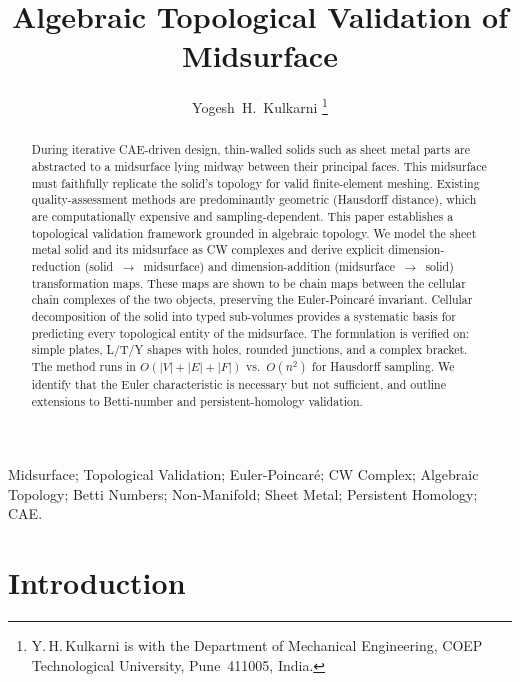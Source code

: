 \documentclass[journal,twocolumn,10pt]{IEEEtran}
\begin{document}

\title{Algebraic Topological Validation of Midsurface}

\author{Yogesh~H.~Kulkarni%
  \thanks{Y.\,H.\,Kulkarni is with the Department of Mechanical Engineering,
          COEP Technological University, Pune~411005, India.}}

\maketitle

\begin{abstract}
During iterative CAE-driven design, thin-walled solids such as sheet metal
parts are abstracted to a midsurface lying midway between their principal
faces. This midsurface must faithfully replicate the solid's topology for
valid finite-element meshing. Existing quality-assessment methods are
predominantly geometric (Hausdorff distance), which are computationally
expensive and sampling-dependent.
This paper establishes a topological validation framework grounded in
algebraic topology. We model the sheet metal solid and its midsurface as
CW complexes and derive explicit dimension-reduction (solid~$\to$~midsurface)
and dimension-addition (midsurface~$\to$~solid) transformation maps. These
maps are shown to be chain maps between the cellular chain complexes of the
two objects, preserving the Euler-Poincar\'e invariant. Cellular decomposition
of the solid into typed sub-volumes provides a systematic basis for predicting
every topological entity of the midsurface.
The formulation is verified on: simple plates, L/T/Y shapes with holes,
rounded junctions, and a complex bracket. The method runs in
$O(|V|+|E|+|F|)$ vs.\ $O(n^2)$ for Hausdorff sampling. We identify that
the Euler characteristic is necessary but not sufficient, and outline
extensions to Betti-number and persistent-homology validation.
\end{abstract}

\begin{IEEEkeywords}
Midsurface; Topological Validation; Euler-Poincar\'e; CW Complex;
Algebraic Topology; Betti Numbers; Non-Manifold; Sheet Metal; Persistent
Homology; CAE.
\end{IEEEkeywords}

\section{Introduction}\label{sec:intro}
\end{document}
